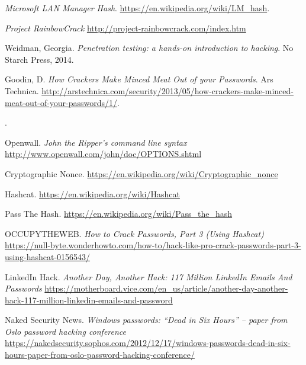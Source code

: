 \documentclass[12pt]{article}
\begin{document}
\begin{thebibliography}{9}
\textit{Microsoft LAN Manager Hash}.
\url{https://en.wikipedia.org/wiki/LM_hash}.

\textit{Project RainbowCrack}
\url{http://project-rainbowcrack.com/index.htm}

Weidman, Georgia. \textit{Penetration testing: a hands-on introduction to hacking}. No Starch Press, 2014.

Goodin, D.
\textit{How Crackers Make Minced Meat Out of your Passwords}.
Ars Technica.
\url{http://arstechnica.com/security/2013/05/how-crackers-make-minced-meat-out-of-your-passwords/1/}.
\date{May 2013}.

Openwall.
\textit{John the Ripper's command line syntax}
\url{http://www.openwall.com/john/doc/OPTIONS.shtml}

Cryptographic Nonce.
\url{https://en.wikipedia.org/wiki/Cryptographic_nonce}

Hashcat.
\url{https://en.wikipedia.org/wiki/Hashcat}

Pass The Hash.
\url{https://en.wikipedia.org/wiki/Pass_the_hash}

OCCUPYTHEWEB.
\textit{How to Crack Passwords, Part 3 (Using Hashcat)}
\url{https://null-byte.wonderhowto.com/how-to/hack-like-pro-crack-passwords-part-3-using-hashcat-0156543/}

LinkedIn Hack.
\textit{Another Day, Another Hack: 117 Million LinkedIn Emails And Passwords}
\url{https://motherboard.vice.com/en_us/article/another-day-another-hack-117-million-linkedin-emails-and-password}

Naked Security News.
\textit{Windows passwords: “Dead in Six Hours” – paper from Oslo password hacking conference}
\url{https://nakedsecurity.sophos.com/2012/12/17/windows-passwords-dead-in-six-hours-paper-from-oslo-password-hacking-conference/}

\end{thebibliography}
\end{document}
